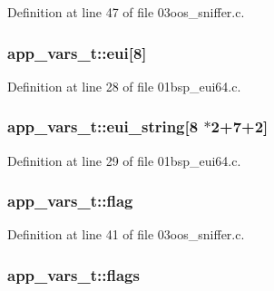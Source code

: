 Definition at line 47 of file 03oos\+\_\+sniffer.\+c.

\subsubsection[{\texorpdfstring{eui}{eui}}]{ app\+\_\+vars\+\_\+t\+::eui\mbox{[}8\mbox{]}}\hypertarget{structapp__vars__t_a628b747f9f8c53fe1f54038fc94be9cb}{}\label{structapp__vars__t_a628b747f9f8c53fe1f54038fc94be9cb}


Definition at line 28 of file 01bsp\+\_\+eui64.\+c.

\subsubsection[{\texorpdfstring{eui\+\_\+string}{eui_string}}]{ app\+\_\+vars\+\_\+t\+::eui\+\_\+string\mbox{[}8 $\ast$2+7+2\mbox{]}}\hypertarget{structapp__vars__t_aeceb033a92dc93021f443b2d44804f64}{}\label{structapp__vars__t_aeceb033a92dc93021f443b2d44804f64}


Definition at line 29 of file 01bsp\+\_\+eui64.\+c.

\subsubsection[{\texorpdfstring{flag}{flag}}]{ app\+\_\+vars\+\_\+t\+::flag}\hypertarget{structapp__vars__t_a4bb5b07d736217f80b8f8f80fd773d09}{}\label{structapp__vars__t_a4bb5b07d736217f80b8f8f80fd773d09}


Definition at line 41 of file 03oos\+\_\+sniffer.\+c.

\subsubsection[{\texorpdfstring{flags}{flags}}]{ app\+\_\+vars\+\_\+t\+::flags}\hypertarget{structapp__vars__t_a2fdfa7c8a87176744b662d4b387df23e}{}\label{structapp__vars__t_a2fdfa7c8a87176744b662d4b387df23e}


